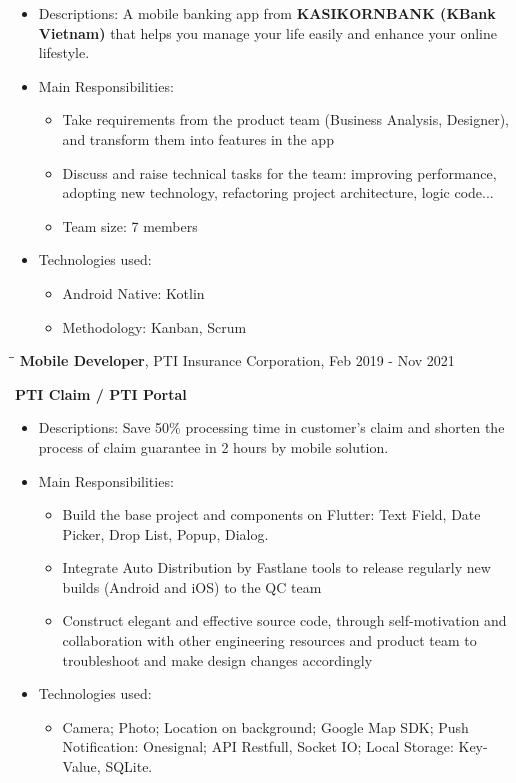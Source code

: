 \documentclass[margin, 10pt]{res}
\begin{document}
\begin{resume}
	\begin{itemize}
		\item Descriptions: A mobile banking app from {\bf KASIKORNBANK (KBank Vietnam)} that helps you manage your life easily and enhance your online lifestyle.
		\item Main Responsibilities:
		\begin{itemize}
   			\item Take requirements from the product team (Business Analysis, Designer), and transform them into features in the app
   			\item Discuss and raise technical tasks for the team: improving performance, adopting new technology, refactoring project architecture, logic code...
   			\item Team size: 7 members 
		\end{itemize}
			\item Technologies used:
		\begin{itemize}
			\item Android Native: Kotlin
			\item Methodology: Kanban, Scrum
		\end{itemize}
	\end{itemize}
   
   \begin{tabbing}
   \hspace{2.0in}\= \hspace{2.0in}\= \kill %
   {\large{\bf Mobile Developer}}, PTI Insurance Corporation, Feb 2019 - Nov 2021\\
   \end{tabbing}
	\vspace{-20pt} %
 	{\bf PTI Claim / PTI Portal}
   \begin{itemize}
   	\item Descriptions: Save 50\% processing time in customer’s claim and shorten the process of claim guarantee in 2 hours by mobile solution.
   	\item Main Responsibilities:
   	\begin{itemize}
   		\item Build the base project and components on Flutter: Text Field, Date Picker, Drop List, Popup, Dialog.
   		\item Integrate Auto Distribution by Fastlane tools to release regularly new builds (Android and iOS) to the QC team
   		\item Construct elegant and effective source code, through self-motivation and collaboration with other engineering resources 
		and product team to troubleshoot and make design changes accordingly
	\end{itemize}
	\item Technologies used:
	\begin{itemize}
		\item Camera; Photo; Location on background; Google Map SDK; Push Notification: Onesignal; API Restfull, Socket IO; Local Storage: Key-Value, SQLite.
	\end{itemize}
	

\end{itemize}
\end{resume}
\end{document}
